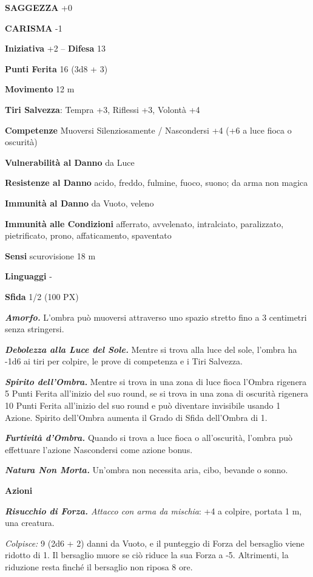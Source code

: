 \begin{multicols}{2}
	\textbf{SAGGEZZA} +0

	\textbf{CARISMA} -1

	\textbf{Iniziativa} +2 -- \textbf{Difesa} 13

	\textbf{Punti Ferita} 16 (3d8 + 3)

	\textbf{Movimento} 12 m

	\textbf{Tiri Salvezza}: Tempra +3, Riflessi +3, Volontà +4

	\textbf{Competenze} Muoversi Silenziosamente / Nascondersi +4 (+6 a luce fioca o oscurità)

	\textbf{Vulnerabilità al Danno} da Luce

	\textbf{Resistenze al Danno} acido, freddo, fulmine, fuoco, suono; da arma non magica

	\textbf{Immunità al Danno} da Vuoto, veleno

	\textbf{Immunità alle Condizioni} afferrato, avvelenato, intralciato, paralizzato, pietrificato, prono, affaticamento, spaventato

	\textbf{Sensi} scurovisione 18 m

	\textbf{Linguaggi} -

	\textbf{Sfida} 1/2 (100 PX)

	\textit{\textbf{Amorfo.}} L'ombra può muoversi attraverso uno spazio stretto fino a 3 centimetri senza stringersi.

	\textit{\textbf{Debolezza alla Luce del Sole.}} Mentre si trova alla luce del sole, l'ombra ha -1d6 ai tiri per colpire, le prove di competenza e i Tiri Salvezza.

	\textit{\textbf{Spirito dell'Ombra.}} Mentre si trova in una zona di luce fioca l'Ombra rigenera 5 Punti Ferita all'inizio del suo round, se si trova in una zona di oscurità rigenera 10 Punti Ferita all'inizio del suo round e può diventare invisibile usando 1 Azione. Spirito dell'Ombra aumenta il Grado di Sfida dell'Ombra di 1.

	\textit{\textbf{Furtività d'Ombra.}} Quando si trova a luce fioca o all'oscurità, l'ombra può effettuare l'azione Nascondersi come azione bonus.

	\textit{\textbf{Natura Non Morta.}} Un'ombra non necessita aria, cibo, bevande o sonno.

	\textbf{Azioni}

	\textit{\textbf{Risucchio di Forza.} Attacco con arma da mischia}: +4 a colpire, portata 1 m, una creatura.

	\textit{Colpisce:} 9 (2d6 + 2) danni da Vuoto, e il punteggio di Forza del bersaglio viene ridotto di 1. Il bersaglio muore se ciò riduce la sua Forza a -5. Altrimenti, la riduzione resta finché il bersaglio non riposa 8 ore.


\end{multicols}
